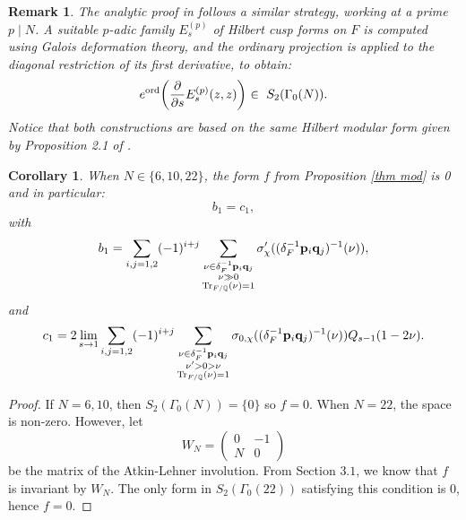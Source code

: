 \documentclass[a4paper,12pt]{article}
\newtheorem{corollary}[theorem]{Corollary}
\newtheorem{remark}[theorem]{Remark}
\begin{document}
\begin{remark}
    The analytic proof in \cite{Daas} follows a similar strategy, working at a prime $p \mid N$. A suitable $p$-adic family $E_{s}^{(p)}$ of Hilbert cusp forms on $F$ is computed using Galois deformation theory, and the ordinary projection is applied to the diagonal restriction of its first derivative, to obtain:
    \begin{equation}\label{p adic Eis Daas}
    e^{\textup{ord}}\biggl(\frac{\partial}{\partial s}E_{s}^{(p)}(z,z)\biggl) \ \in \ S_2(\Gamma_0(N)). 
      \end{equation}
Notice that both constructions are based on the same Hilbert modular form given by Proposition 2.1 of \cite{DDP}.
\end{remark}
\begin{corollary} \label{cor}
    When $N\in\{6,10,22\}$, the form $f$ from Proposition \ref{thm mod} is 0 and in particular:
    \begin{equation}\label{b1=c1}
        b_1=c_1,
    \end{equation}
    with 
    \begin{equation}
    b_1=\sum_{i,j=1,2}(-1)^{i+j}\sum_{\substack{\nu\in \delta_F^{-1}\mathbf{p}_i\mathbf{q}_j\\ \nu\gg0\\ \textup{Tr}_{F/\mathbb{Q}}(\nu)=1}}\sigma'_{\chi}((\delta_F^{-1}\mathbf{p}_i\mathbf{q}_j)^{-1}(\nu)),
     \end{equation}
    and 
    \begin{equation}
    c_1=2\lim_{s\rightarrow1} \sum_{i,j=1,2}(-1)^{i+j}\sum_{\substack{\nu\in \delta_F^{-1}\mathbf{p}_i\mathbf{q}_j\\ \nu'>0>\nu\\ \textup{Tr}_{F/\mathbb{Q}}(\nu)=1}}\sigma_{0,\chi}((\delta_F^{-1}\mathbf{p}_i\mathbf{q}_j)^{-1}(\nu))Q_{s-1}(1-2\nu).
     \end{equation}
\end{corollary}
\begin{proof}
    If $N=6,10$, then $S_2(\Gamma_0(N))=\{0\}$ so $f=0$. When $N=22$, the space is non-zero. However, let 
    \[W_{N}=\begin{pmatrix} 
    0 & -1 \\ N &0 
    \end{pmatrix}\]  
    be the matrix of the Atkin-Lehner involution. From \cite{GrossKohnenZagier87} Section $3.1$, we know that $f$ is invariant by $W_N$. The only form in $S_2(\Gamma_0(22))$ satisfying this condition is 0, hence $f=0$.
\end{proof}
\end{document}
